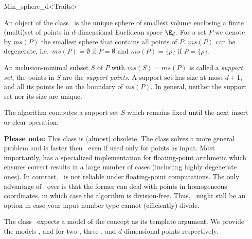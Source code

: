
    \begin{ccRefClass}{Min_sphere_d<Traits>}
\cgalSetMinSphereLayout

\ccDefinition

An object of the class \ccRefName\ is the unique sphere of
smallest volume enclosing a finite (multi)set of points in $d$-dimensional
Euclidean space $\E_d$. For a set $P$ we denote by $ms(P)$ the
smallest sphere that contains all points of $P$. $ms(P)$ can
be degenerate, i.e.\ $ms(P)=\emptyset$
if $P=\emptyset$ and $ms(P)=\{p\}$ if
$P=\{p\}$.

An inclusion-minimal subset $S$ of $P$ with $ms(S)=ms(P)$ is called a
\emph{support set}, the points in $S$ are the \emph{support points}.
A support set has size at most $d+1$, and all its points lie on the
boundary of $ms(P)$. In general, neither the support set nor its size
are unique.

The algorithm
computes a support set $S$ which remains fixed until the next insert
or clear operation.

\textbf{Please note:} This class is (almost) obsolete. The class
 solves a more general problem
and is faster then \ccRefName\, even if used only for points
as input. Most importantly,  has
a specialized implementation for floating-point arithmetic which
ensures correct results in a large number of cases (including
highly degenerate ones). In contrast, \ccRefName\ is not reliable
under floating-point computations. The only advantage of 
\ccRefName\ over  is that the
former can deal with points in homogeneous coordinates, in which 
case the algorithm is division-free. Thus, \ccRefName\ might still
be an option in case your input number type cannot (efficiently) 
divide.


    \ccRequirements
    \ccIndexRequirements

    The class \ccRefName\ expects a model of the concept
     as its template argument.
      We provide the models ,
       and 
    for two-, three-, and $d$-dimensional points respectively.


\end{ccRefClass}
